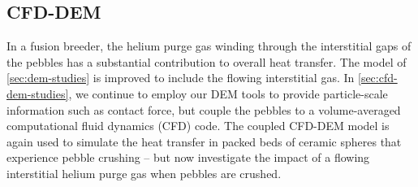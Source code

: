 \subsection*{CFD-DEM}
In a fusion breeder, the helium purge gas winding through the interstitial gaps of the pebbles has a substantial contribution to overall heat transfer.\cite{Reimann:2002mi,Abou-Sena2005} The model of \cref{sec:dem-studies} is improved to include the flowing interstitial gas. In \cref{sec:cfd-dem-studies}, we continue to employ our DEM tools to provide particle-scale information such as contact force, but couple the pebbles to a volume-averaged computational fluid dynamics (CFD) code. The coupled CFD-DEM model is again used to simulate the heat transfer in packed beds of ceramic spheres that experience pebble crushing -- but now investigate the impact of a flowing interstitial helium purge gas when pebbles are crushed.



